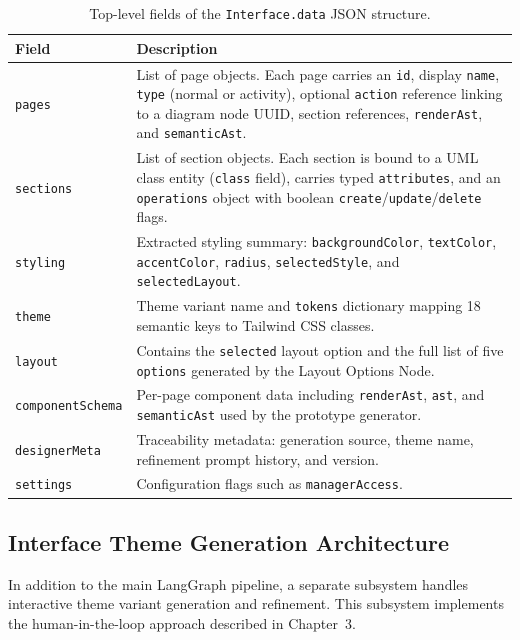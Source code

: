 \begin{table}[H]
\centering
\small
\begin{tabular}{lp{10cm}}
\hline
\textbf{Field} & \textbf{Description} \\
\hline
\texttt{pages} & List of page objects. Each page carries an \texttt{id}, display \texttt{name}, \texttt{type} (normal or activity), optional \texttt{action} reference linking to a diagram node UUID, section references, \texttt{renderAst}, and \texttt{semanticAst}. \\
\texttt{sections} & List of section objects. Each section is bound to a UML class entity (\texttt{class} field), carries typed \texttt{attributes}, and an \texttt{operations} object with boolean \texttt{create}/\texttt{update}/\texttt{delete} flags. \\
\texttt{styling} & Extracted styling summary: \texttt{backgroundColor}, \texttt{textColor}, \texttt{accentColor}, \texttt{radius}, \texttt{selectedStyle}, and \texttt{selectedLayout}. \\
\texttt{theme} & Theme variant name and \texttt{tokens} dictionary mapping 18 semantic keys to Tailwind CSS classes. \\
\texttt{layout} & Contains the \texttt{selected} layout option and the full list of five \texttt{options} generated by the Layout Options Node. \\
\texttt{componentSchema} & Per-page component data including \texttt{renderAst}, \texttt{ast}, and \texttt{semanticAst} used by the prototype generator. \\
\texttt{designerMeta} & Traceability metadata: generation source, theme name, refinement prompt history, and version. \\
\texttt{settings} & Configuration flags such as \texttt{managerAccess}. \\
\hline
\end{tabular}
\caption{Top-level fields of the \texttt{Interface.data} JSON structure.}
\label{tab:interface_data_fields}
\end{table}


\subsection{Interface Theme Generation Architecture}

In addition to the main LangGraph pipeline, a separate subsystem handles interactive theme variant generation and refinement. This subsystem implements the human-in-the-loop approach described in Chapter~3.

